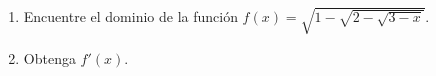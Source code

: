 \item \par
\begin{enumerate}
    \item[(a)] Encuentre el dominio de la función $f(x) = \sqrt{1 - \sqrt{2 - \sqrt{3 - x}}}$.
    \item[(b)] Obtenga $f'(x)$.
\end{enumerate}
